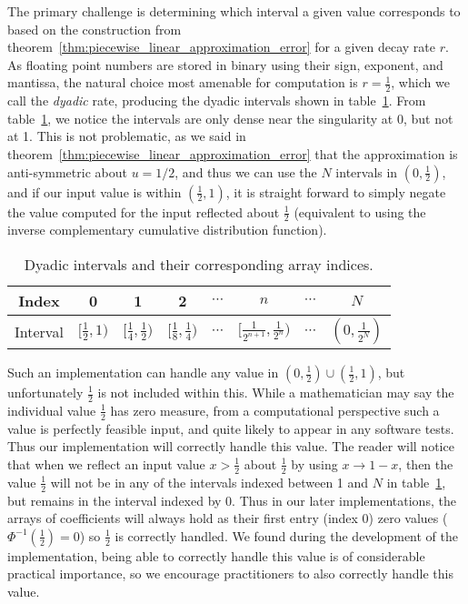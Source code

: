 \documentclass[manuscript,review]{acmart}
\begin{document}
The primary challenge is determining which interval a given value corresponds to based on the construction from theorem~\ref{thm:piecewise_linear_approximation_error} for a given decay rate $ r $. As floating point numbers are stored in binary using their sign, exponent, and mantissa, the natural choice most amenable for computation is $ r = \tfrac{1}{2} $, which we call the \emph{dyadic} rate, producing the dyadic intervals shown in table~\ref{tab:dyadic_intervals}. From table~\ref{tab:dyadic_intervals}, we notice the intervals are only dense near the singularity at 0, but not at 1. This is not problematic, as we said in theorem~\ref{thm:piecewise_linear_approximation_error} that the approximation is anti-symmetric about $ u=1/2 $, and thus we can use the $ N $ intervals in $ (0, \tfrac{1}{2}) $, and if our input value is within $ (\tfrac{1}{2}, 1) $, it is straight forward to simply negate the value computed for the input reflected about $ \tfrac{1}{2} $ (equivalent to using the inverse complementary cumulative distribution function). 

\begin{table}[htb]
\centering
\caption{Dyadic intervals and their corresponding array indices.}
\label{tab:dyadic_intervals}
\renewcommand{\arraystretch}{1.4}  %
\begin{tabular}{c|ccccccc}
Index & 0 & 1 & 2 & $ \cdots $ & $ n $ & $ \cdots $ & $ N $ \\ \hline
Interval & $ [\tfrac{1}{2}, 1) $ & $ [\tfrac{1}{4}, \tfrac{1}{2}) $ & $ [\tfrac{1}{8}, \tfrac{1}{4}) $ & $ \cdots $ & $ [\tfrac{1}{2^{n+1}}, \tfrac{1}{2^n}) $ & $ \cdots $ & $ (0, \tfrac{1}{2^N}) $
\end{tabular}
\end{table}

Such an implementation can handle any value in $ (0, \tfrac{1}{2}) \cup (\tfrac{1}{2}, 1) $, but unfortunately $ \tfrac{1}{2} $ is not included within this. While a mathematician may say the individual value $ \tfrac{1}{2} $ has zero measure, from a computational perspective such a value is perfectly feasible input, and quite likely to appear in any software tests. Thus our implementation will correctly handle this value. The reader will notice that when we reflect an input value $ x > \tfrac{1}{2} $ about $ \tfrac{1}{2} $ by using $ x \to 1 - x $, then the value $ \tfrac{1}{2} $ will not be in any of the intervals indexed between 1 and $ N $ in table~\ref{tab:dyadic_intervals}, but remains in the interval indexed by 0. Thus in our later implementations, the arrays of coefficients will always hold as their first entry (index 0) zero values ($ \Phi^{-1}(\tfrac{1}{2}) = 0 $) so $ \tfrac{1}{2} $ is correctly handled. We found during the development of the implementation, being able to correctly handle this value is of considerable practical importance, so we encourage practitioners to also correctly handle this value. 
\end{document}
